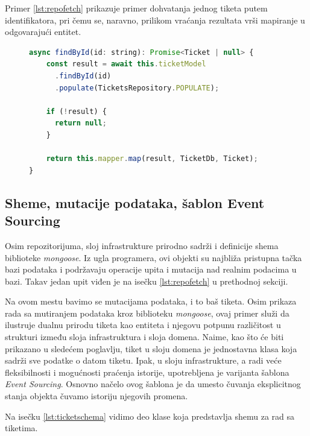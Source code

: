 \documentclass[12pt,oneside]{memoir}
\begin{document}
\newpage
Primer \ref{lst:repofetch} prikazuje primer dohvatanja jednog tiketa putem identifikatora, pri čemu se, naravno, prilikom vraćanja rezultata vrši mapiranje u odgovarajući entitet.

\begin{figure}[h]
\begin{lstlisting}[language=JavaScript, style=ES6, caption={Dohvatanje jednog entiteta.},label={lst:repofetch}]
async findById(id: string): Promise<Ticket | null> {
    const result = await this.ticketModel
      .findById(id)
      .populate(TicketsRepository.POPULATE);
    
    if (!result) {
      return null;
    }
    
    return this.mapper.map(result, TicketDb, Ticket);
}
\end{lstlisting}
\end{figure}

\newpage
\subsection{Sheme, mutacije podataka, šablon Event Sourcing}
\label{sec:eventsourcing}
Osim repozitorijuma, sloj infrastrukture prirodno sadrži i definicije shema biblioteke \textit{mongoose}. Iz ugla programera, ovi objekti su najbliža pristupna tačka bazi podataka i podržavaju operacije upita i mutacija nad realnim podacima u bazi. Takav jedan upit viđen je na isečku \ref{lst:repofetch} u prethodnoj sekciji.

Na ovom mestu bavimo se mutacijama podataka, i to baš tiketa. Osim prikaza rada sa mutiranjem podataka kroz biblioteku \textit{mongoose}, ovaj primer služi da ilustruje dualnu prirodu tiketa kao entiteta i njegovu potpunu različitost u strukturi između sloja infrastruktura i sloja domena. Naime, kao što će biti prikazano u sledećem poglavlju, tiket u sloju domena je jednostavna klasa koja sadrži sve podatke o datom tiketu. Ipak, u sloju infrastrukture, a radi veće fleksibilnosti i mogućnosti praćenja istorije, upotrebljena je varijanta šablona \textit{Event Sourcing}. Osnovno načelo ovog šablona je da umesto čuvanja eksplicitnog stanja objekta čuvamo istoriju njegovih promena.

Na isečku \ref{lst:ticketschema} vidimo deo klase koja predstavlja shemu za rad sa tiketima.
\end{document}
